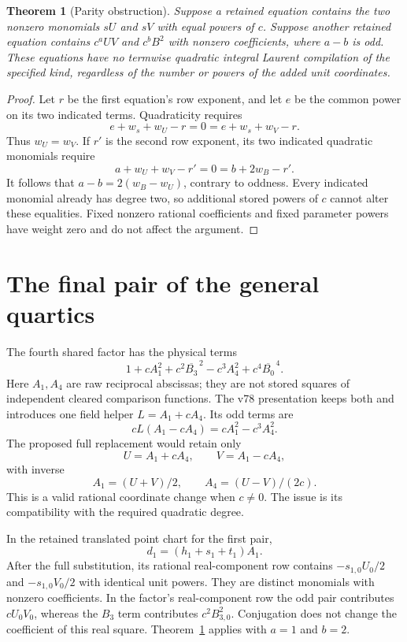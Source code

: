 \documentclass[11pt]{article}
\newtheorem{theorem}{Theorem}
\begin{document}
\begin{theorem}[Parity obstruction]\label{thm:parity}
Suppose a retained equation contains the two nonzero monomials $sU$ and
$sV$ with equal powers of $c$. Suppose another retained equation contains
$c^aUV$ and $c^bB^2$ with nonzero coefficients, where $a-b$ is odd.
These equations have no termwise quadratic integral Laurent compilation
of the specified kind, regardless of the number or powers of the added
unit coordinates.
\end{theorem}
\begin{proof}
Let $r$ be the first equation's row exponent, and let $e$ be the common
power on its two indicated terms. Quadraticity requires
\[
 e+w_s+w_U-r=0=e+w_s+w_V-r.
\]
Thus $w_U=w_V$. If $r'$ is the second row exponent, its two indicated
quadratic monomials require
\[
 a+w_U+w_V-r'=0=b+2w_B-r'.
\]
It follows that $a-b=2(w_B-w_U)$, contrary to oddness. Every indicated
monomial already has degree two, so additional stored powers of $c$
cannot alter these equalities. Fixed nonzero rational coefficients and
fixed parameter powers have weight zero and do not affect the argument.
\end{proof}

\section{The final pair of the general quartics}
The fourth shared factor has the physical terms
\[
 1+cA_1^2+c^2\overline{B_3}^{\,2}-c^3A_4^2
       +c^4\overline{B_0}^{\,4}.
\]
Here $A_1,A_4$ are raw reciprocal abscissas; they are not stored squares
of independent cleared comparison functions. The v78 presentation keeps
both and introduces one field helper $L=A_1+cA_4$. Its odd terms are
\[
 cL(A_1-cA_4)=cA_1^2-c^3A_4^2.
\]
The proposed full replacement would retain only
\[
 U=A_1+cA_4,\qquad V=A_1-cA_4,
\]
with inverse
\[
 A_1=(U+V)/2,\qquad A_4=(U-V)/(2c).
\]
This is a valid rational coordinate change when $c\ne0$. The issue is
its compatibility with the required quadratic degree.

In the retained translated point chart for the first pair,
\[
 d_1=(h_1+s_1+t_1)A_1.
\]
After the full substitution, its rational real-component row contains
$-s_{1,0}U_0/2$ and $-s_{1,0}V_0/2$ with identical unit powers.
They are distinct monomials with nonzero coefficients. In the factor's
real-component row the odd pair contributes $cU_0V_0$, whereas the
$B_3$ term contributes $c^2B_{3,0}^2$. Conjugation does not change the
coefficient of this real square. Theorem~\ref{thm:parity} applies with
$a=1$ and $b=2$.
\end{document}
